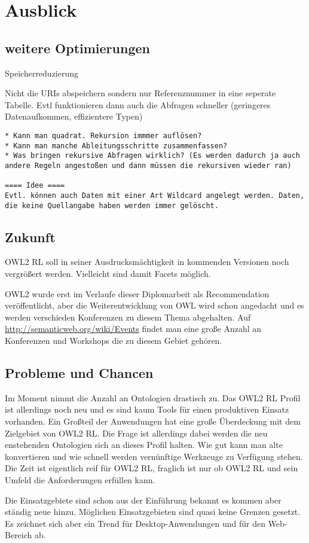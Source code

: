 \chapter{Ausblick}
\label{kapitel-ausblick}

\section{weitere Optimierungen}
Speicherreduzierung

Nicht die URIs abspeichern sondern nur Referenznummer in eine seperate Tabelle. Evtl funktionieren dann auch die Abfragen schneller (geringeres Datenaufkommen, effizientere Typen)

\begin{verbatim} 
* Kann man quadrat. Rekursion immmer auflösen?
* Kann man manche Ableitungsschritte zusammenfassen?
* Was bringen rekursive Abfragen wirklich? (Es werden dadurch ja auch andere Regeln angestoßen und dann müssen die rekursiven wieder ran)

==== Idee ====
Evtl. können auch Daten mit einer Art Wildcard angelegt werden. Daten, die keine Quellangabe haben werden immer gelöscht.

\end{verbatim}

\section{Zukunft}
OWL2 RL soll in seiner Ausdrucksmächtigkeit in kommenden Versionen noch vergrößert werden. Vielleicht sind damit Facets möglich.

OWL2 wurde erst im Verlaufe dieser Diplomarbeit als Recommendation veröffentlicht, aber die Weiterentwicklung von OWL wird schon angedacht \cite{Hitzler2009} und es werden verschieden Konferenzen zu diesem Thema abgehalten. Auf \url{http://semanticweb.org/wiki/Events}
findet man eine große Anzahl an Konferenzen und Workshops die zu diesem Gebiet gehören.

\section{Probleme und Chancen}
Im Moment nimmt die Anzahl an Ontologien drastisch zu. Das OWL2 RL Profil ist allerdings noch neu und es sind kaum Tools für einen produktiven Einsatz vorhanden. Ein Großteil der Anwendungen hat eine große Überdeckung mit dem Zielgebiet von OWL2 RL. Die Frage ist allerdings dabei werden die neu enstehenden Ontologien sich an dieses Profil halten. Wie gut kann man alte konvertieren und wie schnell werden vernünftige Werkzeuge zu Verfügung stehen. Die Zeit ist eigentlich reif für OWL2 RL, fraglich ist nur ob OWL2 RL und sein Umfeld die Anforderungen erfüllen kann.

Die Einsatzgebiete sind schon aus der Einführung bekannt es kommen aber ständig neue hinzu. Möglichen Einsatzgebieten sind quasi keine Grenzen gesetzt. Es zeichnet sich aber ein Trend für Desktop-Anwendungen und für den Web-Bereich ab.